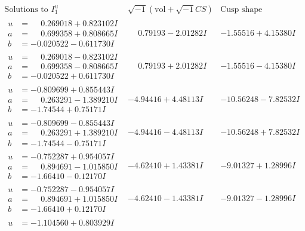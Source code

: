 \documentclass[1p]{elsarticle_modified}
\theoremstyle{definition}
\newcommand{\I}{\sqrt{-1}}
\begin{document}
$$\begin{array}{c|c|c}  
\text{Solutions to }I^u_{1}& \I (\text{vol} + \sqrt{-1}CS) & \text{Cusp shape}\\
 \hline 
\begin{aligned}
u &= \phantom{-}0.269018 + 0.823102 I \\
a &= \phantom{-}0.699358 + 0.808665 I \\
b &= -0.020522 - 0.611730 I\end{aligned}
 & \phantom{-}0.79193 - 2.01282 I & -1.55516 + 4.15380 I \\ \hline\begin{aligned}
u &= \phantom{-}0.269018 - 0.823102 I \\
a &= \phantom{-}0.699358 - 0.808665 I \\
b &= -0.020522 + 0.611730 I\end{aligned}
 & \phantom{-}0.79193 + 2.01282 I & -1.55516 - 4.15380 I \\ \hline\begin{aligned}
u &= -0.809699 + 0.855443 I \\
a &= \phantom{-}0.263291 - 1.389210 I \\
b &= -1.74544 + 0.75171 I\end{aligned}
 & -4.94416 + 4.48113 I & -10.56248 - 7.82532 I \\ \hline\begin{aligned}
u &= -0.809699 - 0.855443 I \\
a &= \phantom{-}0.263291 + 1.389210 I \\
b &= -1.74544 - 0.75171 I\end{aligned}
 & -4.94416 - 4.48113 I & -10.56248 + 7.82532 I \\ \hline\begin{aligned}
u &= -0.752287 + 0.954057 I \\
a &= \phantom{-}0.894691 - 1.015850 I \\
b &= -1.66410 - 0.12170 I\end{aligned}
 & -4.62410 + 1.43381 I & -9.01327 + 1.28996 I \\ \hline\begin{aligned}
u &= -0.752287 - 0.954057 I \\
a &= \phantom{-}0.894691 + 1.015850 I \\
b &= -1.66410 + 0.12170 I\end{aligned}
 & -4.62410 - 1.43381 I & -9.01327 - 1.28996 I \\ \hline\begin{aligned}
u &= -1.104560 + 0.803929 I \\

\end{aligned}
\end{array}$$
\end{document}
